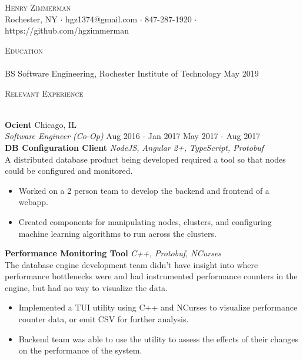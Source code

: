 \documentclass[a4paper]{article}
\newcommand{\lineunder} {
    \vspace*{-8pt} \\
    \hspace*{-18pt} \hrulefill \\
}
\newcommand{\header} [1] {
    {\hspace*{-18pt}\vspace*{6pt} \textsc{#1}}
    \vspace*{-6pt} \lineunder
}
\begin{document}
\vspace*{-40pt}

    

\vspace*{-10pt}
\begin{center}
	{\Huge \scshape {Henry Zimmerman}}\\
	Rochester, NY $\cdot$ hgz1374@gmail.com $\cdot$ 847-287-1920 $\cdot$ https://github.com/hgzimmerman\\
\end{center}

\header{Education}
BS Software Engineering, Rochester Institute of Technology  \hfill  May 2019\\
\vspace{2mm}

\header{Relevant Experience}
\vspace{1mm}

\textbf{Ocient} \hfill Chicago, IL\\
\textit{Software Engineer (Co-Op)} \hfill Aug 2016 - Jan 2017 \textbar{} May 2017 - Aug 2017\\
\vspace*{1mm}
{\textbf{DB Configuration Client}} {\sl NodeJS, Angular 2+, TypeScript, Protobuf} \\
    A distributed database product being developed required a tool so that nodes could be configured and monitored.
\begin{itemize} \itemsep 1pt
	\item Worked on a 2 person team to develop the backend and frontend of a webapp. 
	\item Created components for manipulating nodes, clusters, and configuring machine learning algorithms to run across the clusters.
\end{itemize}
\vspace*{2mm}

{\textbf{Performance Monitoring Tool}} {\sl C++, Protobuf, NCurses} \\
    The database engine development team didn't have insight into where performance bottlenecks were and had instrumented performance counters in the engine, but had no way to visualize the data.
\begin{itemize} \itemsep 1pt
	\item Implemented a TUI utility using C++ and NCurses to visualize performance counter data, or emit CSV for further analysis.
	\item Backend team was able to use the utility to assess the effects of their changes on the performance of the system.
\end{itemize}
\vspace*{2mm}
\end{document}

